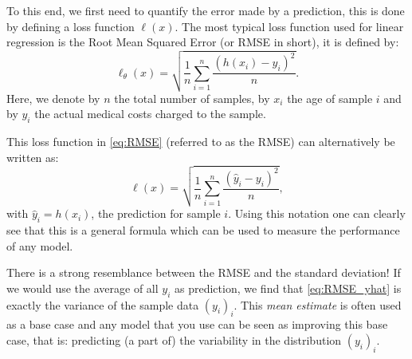 \documentclass[10pt]{extarticle}
\newcommand{\<}{\langle}
\renewcommand{\>}{\rangle}
\theoremstyle{mystyle}{\newtheorem*{remark}{Remark}}
\theoremstyle{mystyle}{\newtheorem*{remarks}{Remarks}}
\theoremstyle{mystyle}{\newtheorem*{example}{Example}}
\theoremstyle{mystyle}{\newtheorem*{examples}{Examples}}
\theoremstyle{definition}{\newtheorem*{exercise}{Exercise}}
\theoremstyle{warn}
\begin{document}
To this end, we first need to quantify the error made by a prediction, this is done by defining a loss function $\ell(x)$. The most typical loss function used for linear regression is the Root Mean Squared Error (or RMSE in short), it is defined by:
\begin{equation} \label{eq:RMSE}
\ell_{\theta}(x) = \sqrt{ \frac{1}{n} \sum_{i=1}^n \frac{(h(x_i) - y_i)^2}{n} }.
\end{equation}
Here, we denote by $n$ the total number of samples, by $x_i$ the age of sample $i$ and by $y_i$ the actual medical costs charged to the sample.
\begin{remark}
This loss function in \eqref{eq:RMSE} (referred to as the RMSE) can alternatively be written as:
\begin{equation} \label{eq:RMSE_yhat}
\ell(x) = \sqrt{ \frac{1}{n} \sum_{i=1}^n \frac{(\hat{y}_i - y_i)^2}{n} },
\end{equation}
with $\hat{y}_i = h(x_i)$, the prediction for sample $i$. Using this notation one can clearly see that this is a general formula which can be used to measure the performance of any model.
\end{remark}
\begin{remark}
There is a strong resemblance between the RMSE and the standard deviation! If we would use the average of all $y_i$ as prediction, we find that \eqref{eq:RMSE_yhat} is exactly the variance of the sample data $(y_i)_i$. This \textit{mean estimate} is often used as a base case and any model that you use can be seen as improving this base case, that is: predicting (a part of) the variability in the distribution $(y_i)_i$.
\end{remark}
\end{document}
